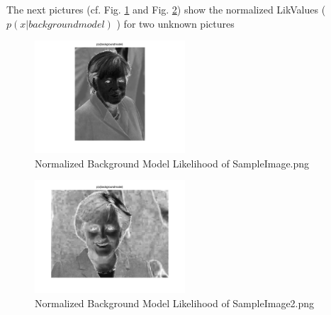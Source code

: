 \documentclass[conference]{IEEEtran}
\begin{document}
\begin{compactenum}[a)]
\newpage
\item The next pictures (cf. Fig. \ref{fig:back1} and Fig. \ref{fig:back2}) show the normalized LikValues ( $p(x \vert backgroundmodel)$ ) for two unknown pictures
\begin{figure}[h!]
  	\centering
    \includegraphics[width=0.5\textwidth]{img/SampleImage-back.png}
    \caption{Normalized Background Model Likelihood of SampleImage.png}
    \label{fig:back1}
\end{figure}
\begin{figure}[h!]
  	\centering
    \includegraphics[width=0.5\textwidth]{img/SampleImage2-back.png}
    \caption{Normalized Background Model Likelihood of SampleImage2.png}
    \label{fig:back2}
\end{figure}


\end{compactenum}
\end{document}
